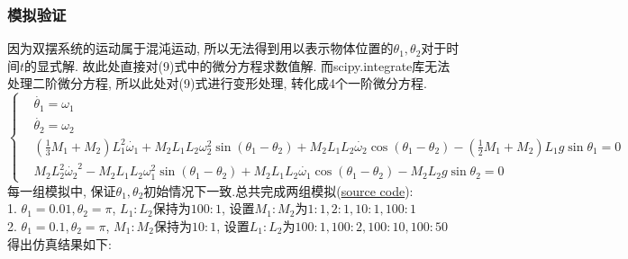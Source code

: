 \documentclass[10.5pt,a4paper]{ctexart}
\begin{document}
\subsubsection*{模拟验证}
因为双摆系统的运动属于混沌运动, 所以无法得到用以表示物体位置的$\theta_1, \theta_2$对于时间$t$的显式解. 故此处直接对(9)式中的微分方程求数值解.
而scipy.integrate库无法处理二阶微分方程, 所以此处对(9)式进行变形处理, 转化成4个一阶微分方程.
\begin{equation}
\left \{ 
  \begin{aligned}
  &\dot{\theta_1} = \omega_1\\
  &\dot{\theta_2} = \omega_2\\
  &\left(\frac{1}{3}M_1 + M_2\right) L_1^2 \dot{\omega_1} + M_2 L_1 L_2 \omega_2^2 \sin\left(\theta_1 - \theta_2\right) + M_2 L_1 L_2 \dot{\omega_2}\cos{\left(\theta_1 - \theta_2\right)} - (\frac{1}{2}M_1 + M_2) L_1 g\sin{\theta_1} = 0\\
  &M_2 L_2^2 \dot{\omega_2}^2 - M_2 L_1 L_2 \omega_1^2 \sin{\left(\theta_1 - \theta_2\right)} + M_2 L_1 L_2 \dot{\omega_1}\cos{\left(\theta_1 - \theta_2\right)} - M_2 L_2 g \sin{\theta_2} = 0
  \end{aligned}
\right.
\end{equation}
每一组模拟中, 保证$\theta_1, \theta_2$初始情况下一致.总共完成两组模拟(\href{https://github.com/zhangmxxx/Physics-paper-2022}{source code}):\\
1. $\theta_1 = 0.01, \theta_2 = \pi$, $L_1 : L_2$保持为$100:1$, 设置$M_1:M_2$为$1:1, 2:1, 10:1, 100:1$\\
2. $\theta_1 = 0.1, \theta_2 = \pi$, $M_1 : M_2$保持为$10:1$, 设置$L_1:L_2$为$100:1, 100:2, 100:10, 100:50$\\
得出仿真结果如下:\\
\end{document}
